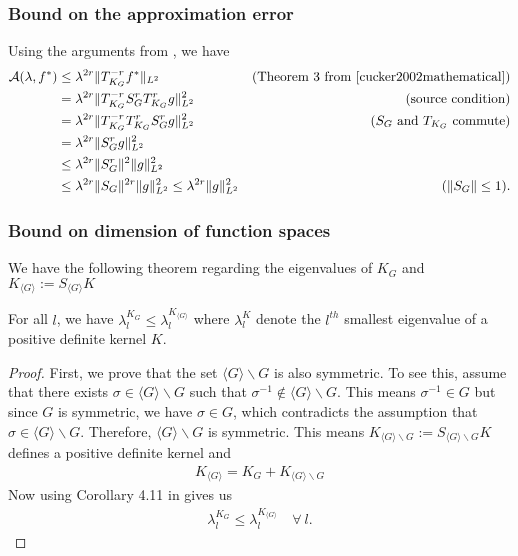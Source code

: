 \subsubsection{Bound on the approximation error}
Using the arguments from \cite{bietti2021sample}, we have
\begin{align}
    \mathcal{A}(\lambda,f^*)&\le \lambda^{2r}\|T_{K_G}^{-r}f^*\|_{L^2} &\text{(Theorem 3 from \cite{cucker2002mathematical})}\\
    &=\lambda^{2r}\|T_{K_G}^{-r}S_G^rT_{K_G}^{r}g\|_{L^2}^2 &\text{(source condition)}\\
    &=\lambda^{2r}\|T_{K_G}^{-r}T_{K_G}^{r}S_G^rg\|_{L^2}^2 &\text{($S_G$ and $T_{K_G}$ commute)}\\
    &=\lambda^{2r}\|S_G^rg\|_{L^2}^2\\
    &\le \lambda^{2r}\|S_G^r\|^2\|g\|_{L^2}^2\\
    &\le \lambda^{2r}\|S_G\|^{2r}\|g\|_{L^2}^2\le \lambda^{2r}\|g\|_{L^2}^2 &(\|S_G\|\le 1).
\end{align}


\subsubsection{Bound on dimension of function spaces}
We have the following theorem regarding the eigenvalues of $K_G$ and $K_{\langle G\rangle}:=S_{\langle G\rangle}K$
\begin{theorem}\label{theoN}
    For all $l$, we have $\lambda^{K_G}_l\le \lambda^{K_{\langle G\rangle}}_l$ where $\lambda^{K}_l$ denote the $l^{th}$ smallest eigenvalue of a positive definite kernel $K$.
\end{theorem}
\begin{proof}
    First, we prove that the set $\langle G\rangle \backslash G$ is also symmetric. To see this, assume that there exists $\sigma\in \langle G\rangle \backslash G$ such that $\sigma^{-1}\notin \langle G\rangle \backslash G$. This means $\sigma^{-1}\in G$ but since $G$ is symmetric, we have $\sigma\in G$, which contradicts the assumption that $\sigma\in \langle G\rangle \backslash G$. Therefore, $\langle G\rangle \backslash G$ is symmetric. This means $K_{\langle G\rangle \backslash G}:=S_{\langle G\rangle \backslash G}K$ defines a positive definite kernel and
    \begin{align}
        K_{\langle G\rangle} = K_{G} + K_{\langle G\rangle \backslash G}
    \end{align}
    Now using Corollary 4.11 in \cite{teschl2014mathematical} gives us
    \begin{align}
        \lambda^{K_G}_l \le \lambda^{K_{\langle G\rangle}}_l\quad\forall\ l.
    \end{align}
\end{proof}

